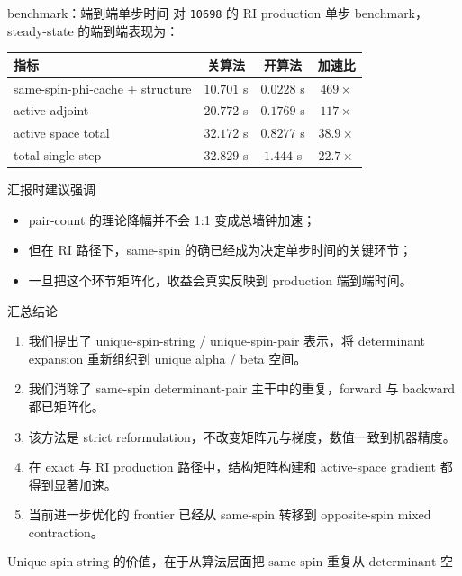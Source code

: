 \documentclass[aspectratio=169,professionalfonts]{ctexbeamer}
\begin{document}
\begin{frame}{benchmark：端到端单步时间}
  \small
  对 \texttt{10698} 的 RI production 单步 benchmark，steady-state 的端到端表现为：

  \vspace{0.4em}
  \begin{tabular}{lccc}
    \toprule
    指标 & 关算法 & 开算法 & 加速比 \\
    \midrule
    same-spin-phi-cache + structure & \(10.701\) s & \(0.0228\) s & \(469\times\) \\
    active adjoint & \(20.772\) s & \(0.1769\) s & \(117\times\) \\
    active space total & \(32.172\) s & \(0.8277\) s & \(38.9\times\) \\
    total single-step & \(32.829\) s & \(1.444\) s & \(22.7\times\) \\
    \bottomrule
  \end{tabular}

  \vspace{0.6em}
  \begin{block}{汇报时建议强调}
    \begin{itemize}
      \item pair-count 的理论降幅并不会 1:1 变成总墙钟加速；
      \item 但在 RI 路径下，same-spin 的确已经成为决定单步时间的关键环节；
      \item 一旦把这个环节矩阵化，收益会真实反映到 production 端到端时间。
    \end{itemize}
  \end{block}
\end{frame}

\begin{frame}{汇总结论}
  \small
  \begin{enumerate}
    \item 我们提出了 unique-spin-string / unique-spin-pair 表示，将 determinant expansion 重新组织到 unique alpha / beta 空间。
    \item 我们消除了 same-spin determinant-pair 主干中的重复，forward 与 backward 都已矩阵化。
    \item 该方法是 strict reformulation，不改变矩阵元与梯度，数值一致到机器精度。
    \item 在 exact 与 RI production 路径中，结构矩阵构建和 active-space gradient 都得到显著加速。
    \item 当前进一步优化的 frontier 已经从 same-spin 转移到 opposite-spin mixed contraction。
  \end{enumerate}

  \vspace{0.8em}
  \[
  \boxed{
  \text{Unique-spin-string 的价值，在于从算法层面把 same-spin 重复从 determinant 空间剥离出来。}
  }
  \]
\end{frame}
\end{document}
